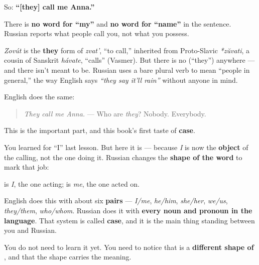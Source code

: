 So: \textbf{\textquotedblleft{}{[}they{]} call me Anna.\textquotedblright{}}

There is \textbf{no word for \textquotedblleft{}my\textquotedblright{}} and \textbf{no word for \textquotedblleft{}name\textquotedblright{}} in the sentence. Russian reports what people call you, not what you possess.

\begin{grammarlens}[title={Grammar Lens: the invisible \textquotedblleft{}they\textquotedblright{}}]
\emph{Zovút} is the \textbf{they} form of \emph{zvat'}, \textquotedblleft{}to call,\textquotedblright{} inherited from Proto-Slavic \emph{*zŭvati}, a cousin of Sanskrit \emph{hávate}, \textquotedblleft{}calls\textquotedblright{} (Vasmer). But there is no \emph{} (\textquotedblleft{}they\textquotedblright{}) anywhere — and there isn't meant to be. Russian uses a bare plural verb to mean \textquotedblleft{}people in general,\textquotedblright{} the way English says \emph{\textquotedblleft{}they say it'll rain\textquotedblright{}} without anyone in mind.

English does the same:

\begin{quote}
\emph{They call me Anna.} — Who are \emph{they}? Nobody. Everybody.
\end{quote}
\end{grammarlens}

\begin{grammarlens}[title={Grammar Lens: \ru{меня} is not \ru{я}}]
This is the important part, and this book's first taste of \textbf{case}.

You learned \textbf{} for \textquotedblleft{}I\textquotedblright{} last lesson. But here it is \textbf{} — because \emph{I} is now the \textbf{object} of the calling, not the one doing it. Russian changes the \textbf{shape of the word} to mark that job:

\textbf{} is \emph{I}, the one acting; \textbf{} is \emph{me}, the one acted on.

English does this with about six \textbf{pairs} — \emph{I/me}, \emph{he/him}, \emph{she/her}, \emph{we/us}, \emph{they/them}, \emph{who/whom}. Russian does it with \textbf{every noun and pronoun in the language}. That system is called \textbf{case}, and it is the main thing standing between you and Russian.

You do not need to learn it yet. You need to notice that \emph{} is a \textbf{different shape of }, and that the shape carries the meaning.
\end{grammarlens}

